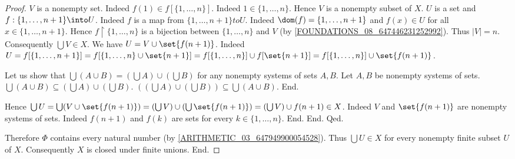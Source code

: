 \begin{forthel}
\begin{proof}
            $V$ is a nonempty set.
            Indeed $f(1) \in f[\{ 1, \dots, n \}]$.
            Indeed $1 \in \{ 1, \dots, n \}$.
            Hence $V$ is a nonempty subset of $X$.
            $U$ is a set and $f : \{ 1, \dots, n + 1 \} \into U$.
            Indeed $f$ is a map from $\{ 1, \dots, n + 1 \} to U$.
            Indeed $\dom(f) = \{ 1, \dots, n + 1 \}$ and $f(x) \in U$ for all $x \in \{ 1, \dots, n + 1 \}$.
            Hence $f \restriction \{ 1, \dots, n \}$ is a bijection between $\{ 1, \dots, n \}$ and $V$ (by \cref{FOUNDATIONS_08_647446231252992}).
            Thus $|V| = n$.
            Consequently $\bigcup V \in X$.
            We have $U = V \cup \set{f(n + 1)}$.
            Indeed $U = f[\{ 1, \dots, n + 1 \}]
              = f[\{ 1, \dots, n \} \cup \set{n + 1}]
              = f[\{ 1, \dots, n \}] \cup f[\set{n + 1}]
              = f[\{ 1, \dots, n \}] \cup \set{f(n + 1)}$.

            Let us show that $\bigcup (A \cup B) =
            (\bigcup A) \cup (\bigcup B)$ for any nonempty systems of sets
            $A, B$.
              Let $A, B$ be nonempty systems of sets.
              $\bigcup (A \cup B) \subseteq (\bigcup A) \cup (\bigcup B)$.
              $((\bigcup A) \cup (\bigcup B)) \subseteq \bigcup (A \cup B)$. %
            End.

            Hence $\bigcup U
              = \bigcup (V \cup \set{f(n + 1)})
              = (\bigcup V) \cup (\bigcup \set{f(n + 1)})
              = (\bigcup V) \cup f(n + 1)
              \in X$.
            Indeed $V$ and $\set{f(n + 1)}$ are nonempty systems of sets.
            Indeed $f(n + 1)$ and $f(k)$ are sets for every $k \in \{ 1, \dots, n \}$.
          End.
        End.
      Qed.

      Therefore $\Phi$ contains every natural number (by \cref{ARITHMETIC_03_647949900054528}).
      Thus $\bigcup U \in X$ for every nonempty finite subset $U$ of $X$.
      Consequently $X$ is closed under finite unions.
    End.
  \end{proof}
\end{forthel}

